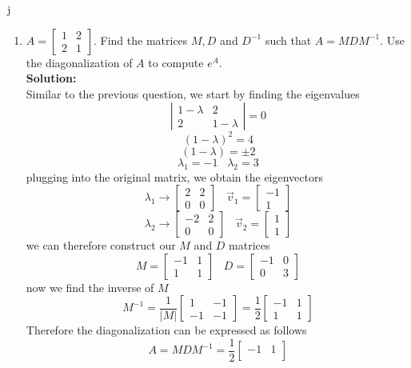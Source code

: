 j\documentclass[12pt]{article}
\begin{document}
\begin{enumerate}
\item $A = \begin{bmatrix} 1&2\\2&1\end{bmatrix}$.  Find the matrices $M, D$ and $D^{-1}$ such that $A = M D M^{-1}$.  Use the diagonalization of $A$ to compute $e^{A}$.\\
\textbf{Solution:}\\
Similar to the previous question, we start by finding the eigenvalues
\[
\left|\begin{matrix}
1-\lambda & 2 \\
2 & 1-\lambda
\end{matrix}\right|
=0
\]
\[
(1-\lambda)^2=4
\]
\[
(1-\lambda)=\pm 2
\]
\[
\lambda_1 = -1\;\;\;\lambda_2=3
\]
plugging into the original matrix, we obtain the eigenvectors
\[
\lambda_1 \rightarrow 
\begin{bmatrix}
    2&2\\
    0&0
\end{bmatrix}\;\;\;
\Vec{v}_1 = 
\begin{bmatrix}
    -1\\1
\end{bmatrix}
\]
\[
\lambda_2 \rightarrow 
\begin{bmatrix}
    -2&2\\
    0&0
\end{bmatrix}\;\;\;
\Vec{v}_2 = 
\begin{bmatrix}
    1\\1
\end{bmatrix}
\]
we can therefore construct our $M$ and $D$ matrices
\[
M=
\begin{bmatrix}
-1 & 1 \\
1 & 1
\end{bmatrix}\;\;\;
D=
\begin{bmatrix}
-1 & 0 \\
0 & 3
\end{bmatrix}
\]
now we find the inverse of $M$
\[
M^{-1}=\frac{1}{|M|}
\begin{bmatrix}
1 & -1 \\
-1 & -1
\end{bmatrix}=
\frac{1}{2}
\begin{bmatrix}
-1 & 1 \\
1 & 1
\end{bmatrix}
\]
Therefore the diagonalization can be expressed as follows
\[
A = MDM^{-1} =
\frac{1}{2}
\begin{bmatrix}
-1 & 1 \\

\end{bmatrix}\]
\end{enumerate}
\end{document}
